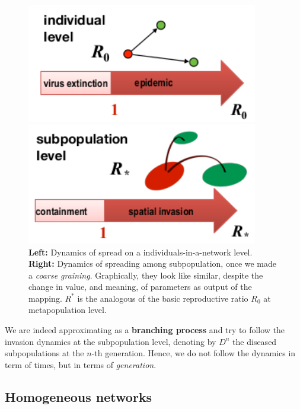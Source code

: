 \documentclass[../main/main.tex]{subfiles}
\begin{document}
\begin{figure}[h!]
\begin{minipage}[c]{0.5\linewidth}
\centering
\includegraphics[width=0.9\textwidth]{../lessons/image/16/image02a.png}
\end{minipage}
\begin{minipage}[]{0.5\linewidth}
\centering
\includegraphics[width=0.9\textwidth]{../lessons/image/16/image02b.png}
\end{minipage}
\caption{\label{fig:16_02} \textbf{Left:} Dynamics of spread on a individuals-in-a-network level. \textbf{Right:} Dynamics of spreading among subpopulation, once we made a \textit{coarse graining}. Graphically, they look like similar, despite the change in value, and meaning, of parameters as output of the mapping. $R^*$ is the analogous of the basic reproductive ratio $R_0$ at metapopulation level.}
\end{figure}

We are indeed approximating as a \textbf{branching process} and try to follow the invasion dynamics at the subpopulation level, denoting by $D^n$ the diseased subpopulations at the $n$-th generation. Hence, we do not follow the dynamics in term of times, but in terms of \textit{generation}.


\subsection{Homogeneous networks}
\end{document}
